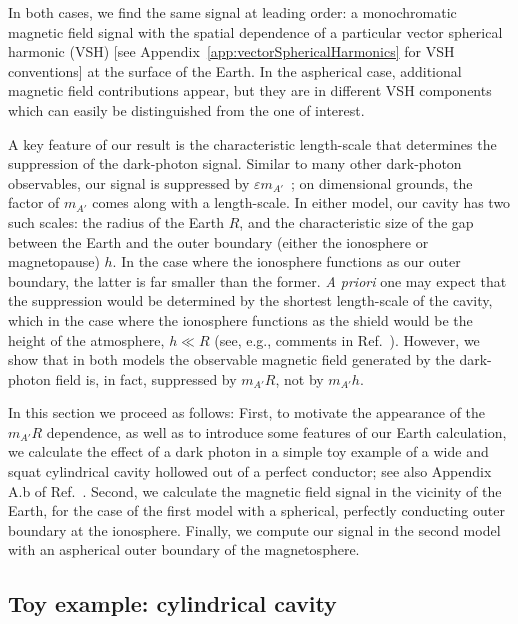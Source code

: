 \documentclass[amsmath,amssymb,aps,10pt,prd,letterpaper,nofootinbib,balancelastpage,notitlepage,superscriptaddress,twocolumn,floatfix]{revtex4-2}
\newcommand{\appref}[2][x]{Appendi{#1}~\ref{#2}}	%
\newcommand{\citeR}[2][]{Ref{#1}.~\cite{#2}}		%
\begin{document}
In both cases, we find the same signal at leading order: a monochromatic magnetic field signal with the spatial dependence of a particular vector spherical harmonic (VSH) [see \appref{app:vectorSphericalHarmonics} for VSH conventions] at the surface of the Earth.
In the aspherical case, additional magnetic field contributions appear, but they are in different VSH components which can easily be distinguished from the one of interest.

A key feature of our result is the characteristic length-scale that determines the suppression of the dark-photon signal. 
Similar to many other dark-photon observables, our signal is suppressed by $\varepsilon m_{A'}$~\cite{Chaudhuri:2014dla,Dubovsky:2015cca,Bhoonah:2018gjb,McDermott:2019lch,Wadekar:2019xnf,Kovetz:2018zes}; on dimensional grounds, the factor of $m_{A'}$ comes along with a length-scale.
In either model, our cavity has two such scales: the radius of the Earth $R$, and the characteristic size of the gap between the Earth and the outer boundary (either the ionosphere or magnetopause) $h$.
In the case where the ionosphere functions as our outer boundary, the latter is far smaller than the former.
\emph{A priori} one may expect that the suppression would be determined by the shortest length-scale of the cavity, which in the case where the ionosphere functions as the shield would be the  height of the atmosphere, $h \ll R$ (see, e.g., comments in \citeR{Dubovsky:2015cca}). 
However, we show that in both models the observable magnetic field generated by the dark-photon field is, in fact, suppressed by $m_{A'}R$, not by $m_{A'}h$.

In this section we proceed as follows:
First, to motivate the appearance of the $m_{A'}R$ dependence, as well as to introduce some features of our Earth calculation, we calculate the effect of a dark photon in a simple toy example of a wide and squat cylindrical cavity hollowed out of a perfect conductor; see also Appendix A.b of \citeR{Chaudhuri:2014dla}.
Second, we calculate the magnetic field signal in the vicinity of the Earth, for the case of the first model with a spherical, perfectly conducting outer boundary at the ionosphere.
Finally, we compute our signal in the second model with an aspherical outer boundary of the magnetosphere.


\subsection{Toy example: cylindrical cavity}
\label{sec:toyTheory}
\end{document}
